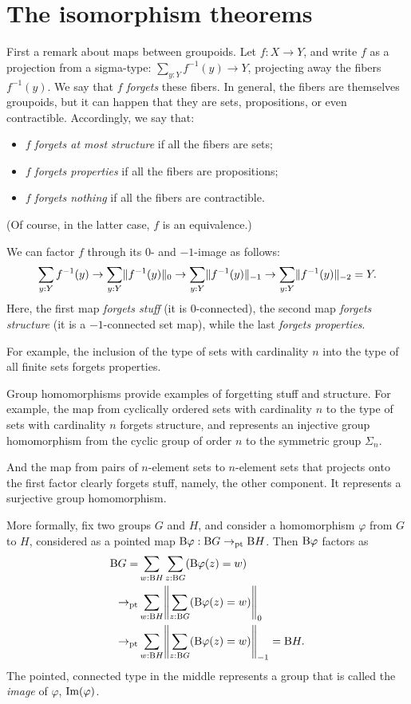 \section{The isomorphism theorems}
\label{sec:noether-theorems}

First a remark about maps between groupoids.
Let $f : X \to Y$, and write $f$ as a projection from a sigma-type:
$\sum_{y:Y} f^{-1}(y) \to Y$,
projecting away the fibers $f^{-1}(y)$.
We say that $f$ \emph{forgets} these fibers.
In general, the fibers are themselves groupoids,
but it can happen that they are sets, propositions, or even contractible.
Accordingly, we say that:
\begin{itemize}
\item $f$ \emph{forgets at most structure} if all the fibers are sets;
\item $f$ \emph{forgets properties} if all the fibers are propositions;
\item $f$ \emph{forgets nothing} if all the fibers are contractible.
\end{itemize}
(Of course, in the latter case, $f$ is an equivalence.)

We can factor $f$ through its $0$- and $-1$-image as follows:
\[
  \sum_{y:Y} f^{-1}(y) \to
  \sum_{y:Y} \lVert f^{-1}(y)\rVert_0 \to
  \sum_{y:Y} \lVert f^{-1}(y)\rVert_{-1} \to
  \sum_{y:Y} \lVert f^{-1}(y)\rVert_{-2} = Y.
\]
Here, the first map \emph{forgets stuff} (it is $0$-connected),
the second map \emph{forgets structure} (it is a $-1$-connected set map),
while the last \emph{forgets properties}.

For example, the inclusion of the type of sets with cardinality
$n$ into the type of all finite sets
forgets properties.

Group homomorphisms provide examples of forgetting stuff and structure.
For example, the map from cyclically ordered sets with cardinality $n$
to the type of sets with cardinality $n$ forgets structure,
and represents an injective group homomorphism from the cyclic
group of order $n$ to the symmetric group $\Sigma_n$.

And the map from pairs of $n$-element sets to $n$-element sets
that projects onto the first factor clearly forgets stuff,
namely, the other component.
It represents a surjective group homomorphism.

More formally, fix two groups $G$ and $H$,
and consider a homomorphism $\varphi$ from $G$ to $H$,
considered as a pointed map $\mathrm B\varphi : \mathrm B G \to_{\mathord{\mathrm{pt}}} \mathrm B H$.
Then $\mathrm B\varphi$ factors as
\begin{align*}
  \B G
  = &\sum_{w:\B H}\sum_{z:\B G}(\B\varphi(z)=w)\\
  \to_\pt &\sum_{w:\B H}\Trunc*{\sum_{z:\B G}(\B\varphi(z)=w)}_0\\
  \to_\pt &\sum_{w:\B H}\Trunc*{\sum_{z:\B G}(\B\varphi(z)=w)}_{-1} = \B H.
\end{align*}
The pointed, connected type in the middle represents a group
that is called the \emph{image} of $\varphi$, $\operatorname{Im}(\varphi)$.

